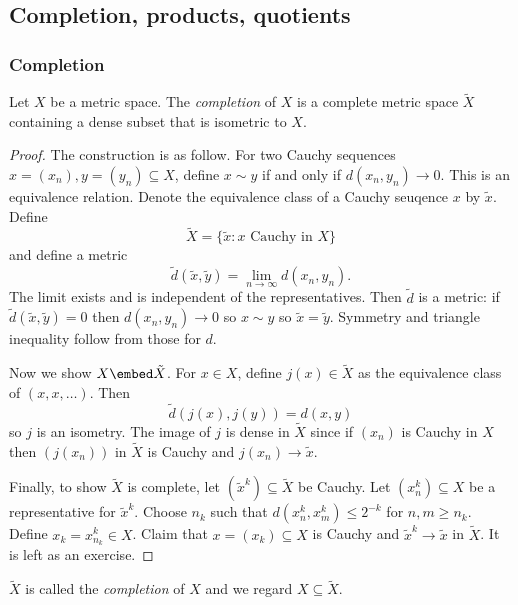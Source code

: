 \documentclass[a4paper]{article}
\begin{document}
\subsection{Completion, products, quotients}

\subsubsection{Completion}

\begin{proposition}
  Let \(X\) be a metric space. The \emph{completion} of \(X\) is a complete metric space \(\tilde X\) containing a dense subset that is isometric to \(X\).
\end{proposition}

\begin{proof}
The construction is as follow. For two Cauchy sequences \(x = (x_n), y = (y_n) \subseteq X\), define \(x \sim y\) if and only if \(d(x_n, y_n) \to 0\). This is an equivalence relation. Denote the equivalence class of a Cauchy seuqence \(x\) by \(\tilde x\). Define
\[
  \tilde X = \{\tilde x: x \text{ Cauchy in } X\}
\]
and define a metric
\[
  \tilde d(\tilde x, \tilde y) = \lim_{n \to \infty} d(x_n, y_n).
\]
The limit exists and is independent of the representatives. Then \(\tilde d\) is a metric: if \(\tilde d(\tilde x, \tilde y) = 0\) then \(d(x_n, y_n) \to 0\) so \(x \sim y\) so \(\tilde x = \tilde y\). Symmetry and triangle inequality follow from those for \(d\).

Now we show \(X \embed \tilde X\). For \(x \in X\), define \(j(x) \in \tilde X\) as the equivalence class of \((x, x, \dots)\). Then
\[
  \tilde d(j(x), j(y)) = d(x, y)
\]
so \(j\) is an isometry. The image of \(j\) is dense in \(\tilde X\) since if \((x_n)\) is Cauchy in \(X\) then \((j(x_n))\) in \(\tilde X\) is Cauchy and \(j(x_n) \to \tilde x\).

Finally, to show \(\tilde X\) is complete, let \((\tilde x^k) \subseteq \tilde X\) be Cauchy. Let \((x^k_n) \subseteq X\) be a representative for \(\tilde x^k\). Choose \(n_k\) such that \(d(x_n^k, x_m^k) \leq 2^{-k}\) for \(n, m \geq n_k\). Define \(x_k = x_{n_k}^k \in X\). Claim that \(x = (x_k) \subseteq X\) is Cauchy and \(\tilde x^k \to \tilde x\) in \(\tilde X\). It is left as an exercise.
\end{proof}

\begin{definition}[completion]
  \(\tilde X\) is called the \emph{completion} of \(X\) and we regard \(X \subseteq \tilde X\).
\end{definition}
\end{document}
